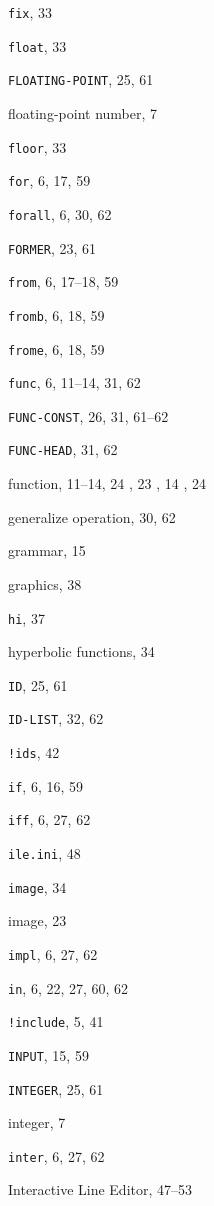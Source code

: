 \begin{theindex}
\item {{\tt fix}}, 33
\item {{\tt float}}, 33
\item {{\tt FLOATING-POINT}}, 25, 61
\item {floating-point number}, 7
\item {{\tt floor}}, 33
\item {{\tt for}}, 6, 17, 59
\item {{\tt forall}}, 6, 30, 62
\item {{\tt FORMER}}, 23, 61
\item {{\tt from}}, 6, 17--18, 59
\item {{\tt fromb}}, 6, 18, 59
\item {{\tt frome}}, 6, 18, 59
\item {{\tt func}}, 6, 11--14, 31, 62
\item {{\tt FUNC-CONST}}, 26, 31, 61--62
\item {{\tt FUNC-HEAD}}, 31, 62
\item {function}, 11--14, 24
	, 23
	, 14
	, 24
\indexspace
\item {generalize operation}, 30, 62
\item {grammar}, 15
\item {graphics}, 38
\indexspace
\item {{\tt hi}}, 37
\item {hyperbolic functions}, 34
\indexspace
\item {{\tt ID}}, 25, 61
\item {{\tt ID-LIST}}, 32, 62
\item {{\tt !ids}}, 42
\item {{\tt if}}, 6, 16, 59
\item {{\tt iff}}, 6, 27, 62
\item {{\tt ile.ini}}, 48
\item {{\tt image}}, 34
\item {image}, 23
\item {{\tt impl}}, 6, 27, 62
\item {{\tt in}}, 6, 22, 27, 60, 62
\item {{\tt !include}}, 5, 41
\item {{\tt INPUT}}, 15, 59
\item {{\tt INTEGER}}, 25, 61
\item {integer}, 7
\item {{\tt inter}}, 6, 27, 62
\item {Interactive Line Editor}, 47--53

\end{theindex}
